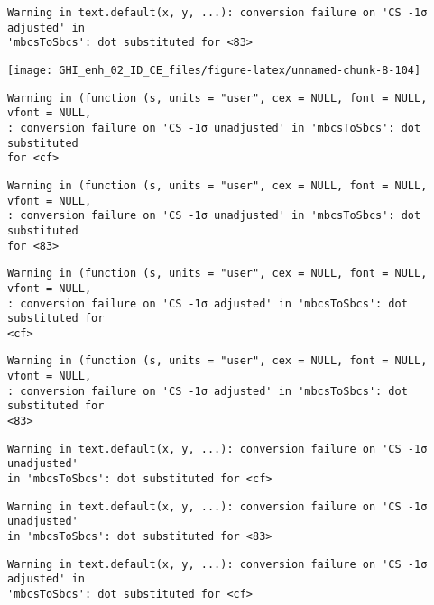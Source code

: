 \documentclass[
  10pt,
  a4paper,oneside]{article}
\begin{document}
\begin{verbatim}
Warning in text.default(x, y, ...): conversion failure on 'CS -1σ adjusted' in
'mbcsToSbcs': dot substituted for <83>
\end{verbatim}

\begin{center}\texttt{[image: GHI\_enh\_02\_ID\_CE\_files/figure-latex/unnamed-chunk-8-104]} \end{center}

\begin{verbatim}
Warning in (function (s, units = "user", cex = NULL, font = NULL, vfont = NULL,
: conversion failure on 'CS -1σ unadjusted' in 'mbcsToSbcs': dot substituted
for <cf>
\end{verbatim}

\begin{verbatim}
Warning in (function (s, units = "user", cex = NULL, font = NULL, vfont = NULL,
: conversion failure on 'CS -1σ unadjusted' in 'mbcsToSbcs': dot substituted
for <83>
\end{verbatim}

\begin{verbatim}
Warning in (function (s, units = "user", cex = NULL, font = NULL, vfont = NULL,
: conversion failure on 'CS -1σ adjusted' in 'mbcsToSbcs': dot substituted for
<cf>
\end{verbatim}

\begin{verbatim}
Warning in (function (s, units = "user", cex = NULL, font = NULL, vfont = NULL,
: conversion failure on 'CS -1σ adjusted' in 'mbcsToSbcs': dot substituted for
<83>
\end{verbatim}

\begin{verbatim}
Warning in text.default(x, y, ...): conversion failure on 'CS -1σ unadjusted'
in 'mbcsToSbcs': dot substituted for <cf>
\end{verbatim}

\begin{verbatim}
Warning in text.default(x, y, ...): conversion failure on 'CS -1σ unadjusted'
in 'mbcsToSbcs': dot substituted for <83>
\end{verbatim}

\begin{verbatim}
Warning in text.default(x, y, ...): conversion failure on 'CS -1σ adjusted' in
'mbcsToSbcs': dot substituted for <cf>
\end{verbatim}
\end{document}
